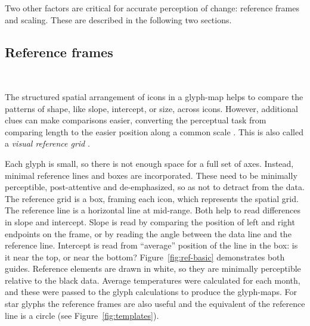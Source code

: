 \documentclass[oneside]{article}
\begin{document}
Two other factors are critical for accurate perception of change: reference frames and scaling. These are described in the following two sections.

\subsection{Reference frames}~\label{sec:reference}

The structured spatial arrangement of icons in a glyph-map helps to compare the patterns of shape, like slope, intercept, or size, across icons. However, additional clues can make comparisons easier, converting the perceptual task from comparing length to the easier position along a common scale \citep{cleveland:1984}. This is also called a \emph{visual reference grid} \citep{cleveland:1993a}.

Each glyph is small, so there is not enough space for a full set of axes. Instead, minimal reference lines and boxes are incorporated. These need to be minimally perceptible, post-attentive \citep{healey} and de-emphasized, so as not to detract from the data. The reference grid is a box, framing each icon, which represents the spatial grid. The reference line is a horizontal line at mid-range. Both help to read differences in slope and intercept. Slope is read by comparing the position of left and right endpoints on the frame, or by reading the angle between the data line and the reference line. Intercept is read from ``average'' position of the line in the box: is it near the top, or near the bottom? Figure~\ref{fig:ref-basic} demonstrates both guides. Reference elements are drawn in white, so they are minimally perceptible relative to the black data. Average temperatures were calculated for each month, and these were passed to the glyph calculations to produce the glyph-maps.   For star glyphs the reference frames are also useful and the equivalent of the reference line is a circle (see Figure~\ref{fig:templates}).


\end{document}
